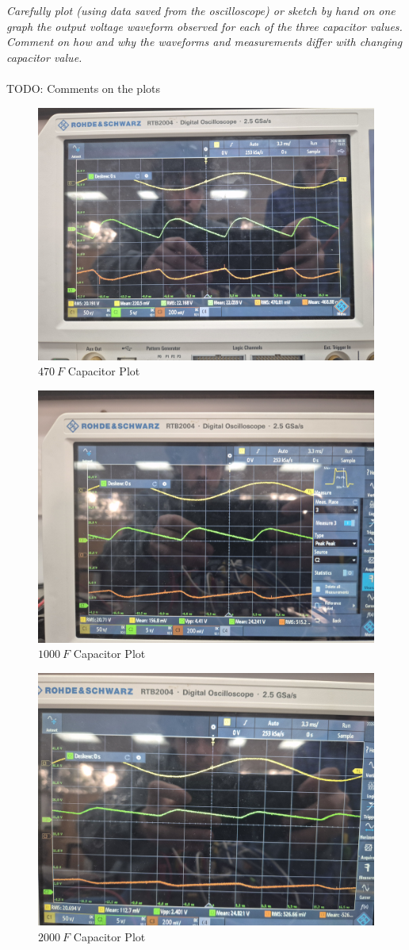 \documentclass[12pt,a4paper]{article}
\begin{document}
\textit{Carefully plot (using data saved from the oscilloscope) or sketch by hand on one graph the output voltage waveform observed for each of the three capacitor values. Comment on how and why the
waveforms and measurements differ with changing capacitor value.}\\\\

TODO: Comments on the plots
\begin{figure}[H]
        \centering
	\includegraphics[width=0.7\columnwidth]{Images/20250828_134829.jpg}
	\caption{$470\:F$ Capacitor Plot}
	\label{fig:470F Cap Plot}
\end{figure}
\begin{figure}[H]
        \centering
	\includegraphics[width=0.7\columnwidth]{Images/20250828_135102.jpg}
	\caption{$1000\:F$ Capacitor Plot}
	\label{fig:1000F Cap Plot}
\end{figure}
\begin{figure}[H]
        \centering
	\includegraphics[width=0.7\columnwidth]{Images/20250828_135318.jpg}
	\caption{$2000\:F$ Capacitor Plot}
	\label{fig:2000F Cap Plot}
\end{figure}
\end{document}
